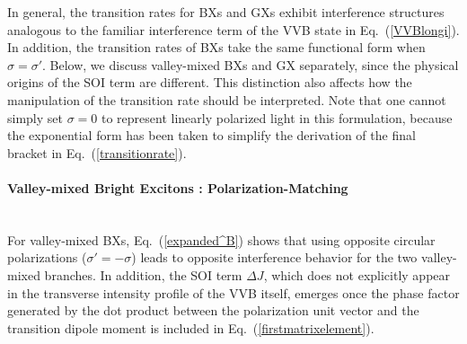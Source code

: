 In general, the transition rates for BXs and GXs exhibit interference structures analogous to the familiar interference term of the VVB state in Eq.~(\ref{VVBlongi}). In addition, the transition rates of BXs take the same functional form when $\sigma=\sigma'$. Below, we discuss valley-mixed BXs and GX separately, since the physical origins of the SOI term are different. This distinction also affects how the manipulation of the transition rate should be interpreted. Note that one cannot simply set $\sigma=0$ to represent linearly polarized light in this formulation, because the exponential form has been taken to simplify the derivation of the final bracket in Eq.~(\ref{transitionrate}).

\paragraph*{Valley-mixed Bright Excitons : Polarization-Matching}~\\

For valley-mixed BXs, Eq.~(\ref{expanded^B}) shows that using opposite circular polarizations ($\sigma'=-\sigma$) leads to opposite interference behavior for the two valley-mixed branches. In addition, the SOI term $\Delta J$, which does not explicitly appear in the transverse intensity profile of the VVB itself, emerges once the phase factor generated by the dot product between the polarization unit vector and the transition dipole moment is included in Eq.~(\ref{firstmatrixelement}). 
 
